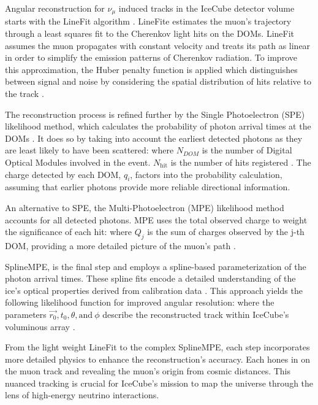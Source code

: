 Angular reconstruction for $\nu_\mu$ induced tracks in the IceCube detector volume starts with the LineFit algorithm \cite{AMANDA_trackreco}.
LineFite estimates the muon's trajectory through a least squares fit to the Cherenkov light hits on the DOMs.
LineFit assumes the muon propagates with constant velocity and treats its path as linear in order to simplify the emission patterns of Cherenkov radiation.
To improve this approximation, the Huber penalty function \cite{Huber:1964} is applied which distinguishes between signal and noise by considering the spatial distribution of hits relative to the track \cite{IC3_Calibration}.

The reconstruction process is refined further by the Single Photoelectron (SPE) likelihood method, which calculates the probability of photon arrival times at the DOMs \cite{Huber:1964}.
It does so by taking into account the earliest detected photons as they are least likely to have been scattered:
\spe
where $N_{DOM}$ is the number of Digital Optical Modules involved in the event.
$N_{\mathrm{hit}}$ is the number of hits registered \cite{AMANDA_trackreco}.
The charge detected by each DOM, $q_i$, factors into the probability calculation, assuming that earlier photons provide more reliable directional information.

An alternative to SPE, the Multi-Photoelectron (MPE) likelihood method accounts for all detected photons.
MPE uses the total observed charge to weight the significance of each hit:
\mpe
where $Q_j$ is the sum of charges observed by the j-th DOM, providing a more detailed picture of the muon's path \cite{AMANDA_trackreco}.

SplineMPE, is the final step and employs a spline-based parameterization of the photon arrival times.
These spline fits encode a detailed understanding of the ice's optical properties derived from calibration data \cite{AMANDA_trackreco}.
This approach yields the following likelihood function for improved angular resolution:
\splineMPE
where the parameters $\vec{r_0}, t_0, \theta, \mathrm{ and}~\phi$ describe the reconstructed track within IceCube's voluminous array \cite{AMANDA_trackreco}.

From the light weight LineFit to the complex SplineMPE, each step incorporates more detailed physics to enhance the reconstruction's accuracy.
Each hones in on the muon track and revealing the muon's origin from cosmic distances.
This nuanced tracking is crucial for IceCube's mission to map the universe through the lens of high-energy neutrino interactions.

